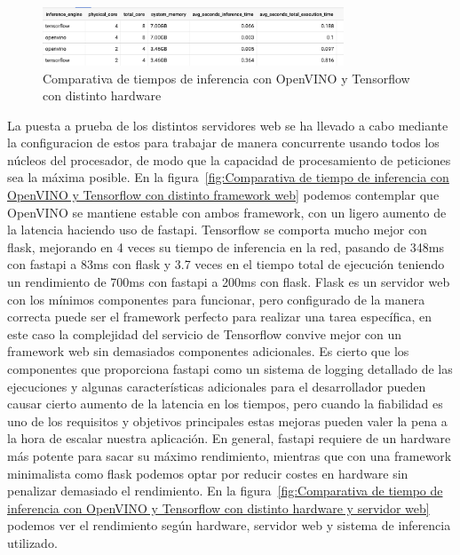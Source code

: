 \begin{figure}
    \centering
    \includegraphics[width=0.8\textwidth]{images/chapter5/time_inference_system_engine.png}
    \caption{Comparativa de tiempos de inferencia con OpenVINO y Tensorflow con distinto hardware}
    \label{fig:Comparativa de tiempo de inferencia con OpenVINO y Tensorflow con distinto hardware}
\end{figure}

La puesta a prueba de los distintos servidores web se ha llevado a cabo mediante la configuracion de estos para trabajar de manera concurrente usando todos los núcleos del
procesador, de modo que la capacidad de procesamiento de peticiones sea la máxima posible.
En la figura~\ref{fig:Comparativa de tiempo de inferencia con OpenVINO y Tensorflow con distinto framework web} podemos contemplar que OpenVINO se mantiene estable con ambos framework, con un ligero aumento de la latencia haciendo uso de fastapi.
Tensorflow se comporta mucho mejor con flask, mejorando en 4 veces su tiempo de inferencia en la red, pasando de 348ms con fastapi a 83ms con flask y 3.7 veces en el tiempo total de ejecución teniendo un rendimiento de 700ms con fastapi a 200ms con flask.
Flask es un servidor web con los mínimos componentes para funcionar, pero configurado de la manera correcta puede ser el framework perfecto para realizar una tarea específica, en este caso
la complejidad del servicio de Tensorflow convive mejor con un framework web sin demasiados componentes adicionales.
Es cierto que los componentes que proporciona fastapi como un sistema de logging detallado de las ejecuciones y algunas características adicionales
para el desarrollador pueden causar cierto aumento de la latencia en los tiempos, pero cuando la fiabilidad es uno de los requisitos y objetivos principales estas mejoras
pueden valer la pena a la hora de escalar nuestra aplicación.
En general, fastapi requiere de un hardware más potente para sacar su máximo rendimiento, mientras que con una framework minimalista como flask podemos optar por reducir costes en hardware sin penalizar demasiado
el rendimiento.
En la figura~\ref{fig:Comparativa de tiempo de inferencia con OpenVINO y Tensorflow con distinto hardware y servidor web} podemos ver el rendimiento según hardware, servidor web y sistema de inferencia utilizado.

